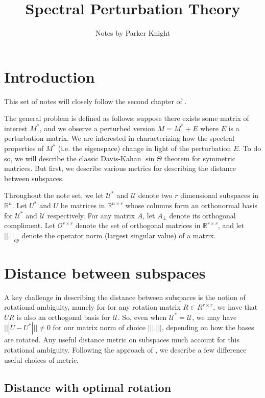 \documentclass{amsart}
\title{Spectral Perturbation Theory}
\author{Notes by Parker Knight}
\newcommand{\R}{\mathbb{R}}
\newcommand{\calU}{\mathcal{U}}
\newcommand{\calO}{\mathcal{O}}
\begin{document}
\maketitle

\section{Introduction}

This set of notes will closely follow the second chapter of \cite{chen_spectral_2021}.

The general problem is defined as follows: suppose there exists some matrix of interest $M^{*}$, and we observe a perturbed version $M = M^{*} + E$ where $E$ is a perturbation matrix. We are interested in characterizing how the spectral properties of $M^{*}$ (i.e. the eigenspace) change in light of the perturbation $E$. To do so, we will describe the classic Davis-Kahan $\sin \Theta$ theorem for symmetric matrices. But first, we describe various metrics for describing the distance between subspaces.

Throughout the note set, we let $\calU^{*}$ and $\calU$ denote two $r$ dimensional subspaces in $\R^{n}$. Let $U^{*}$ and $U$ be matrices in $\R^{n \times r}$ whose columns form an orthonormal basis for $\calU^{*}$ and $\calU$ respectively. For any matrix $A$, let $A_{\perp}$ denote its orthogonal compliment. Let $\calO^{r \times r}$ denote the set of orthogonal matrices in $\R^{r \times r}$, and let $||.||_{op}$ denote the operator norm (largest singular value) of a matrix.

\section{Distance between subspaces}

A key challenge in describing the distance between subspaces is the notion of rotational ambiguity, namely for for any rotation matrix $R \in R^{r \times r}$, we have that $UR$ is also an orthogonal basis for $\calU$. So, even when $\calU^{*} = \calU$, we may have $|||U - U^*||| \neq 0$ for our matrix norm of choice $||| . |||$, depending on how the bases are rotated. Any useful distance metric on subspaces much account for this rotational ambiguity. Following the approach of \cite{chen_spectral_2021}, we describe a few difference useful choices of metric.

\subsection{Distance with optimal rotation}
\end{document}
